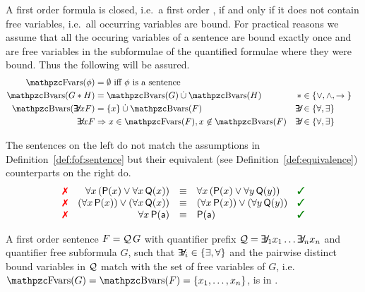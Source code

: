 \begin{definition}\label{def:fof:closed}\label{def:fof:sentence}
	A first order formula is closed, i.e.~a first order ,
	if and only if it does not contain free variables, 
	i.e.~all occurring variables are bound.
	For practical reasons we assume that all the occuring variables of a sentence
	are bound exactly once
	and are free variables
	in the subformulae of the quantified formulae where they were bound.
	Thus the following will be assured.
	\begin{align*}
		\fvar(\phi) &= \emptyset
		\text{ iff }\phi\text{ is a sentence}
		\\
		\bvar(G \connect H) &= \bvar(G)\disjointunion\bvar(H)
		&\connect& \in \SetOfConnectives
		\\
		\bvar(\quantify x F) &= \{x\}\disjointunion\bvar(F)
		&\quantify& \in \SetOfQuantifiers
		\\
		\quantify x F &\Rightarrow
		x\in\fvar(F), x\not\in\bvar(F)
		&\quantify& \in \SetOfQuantifiers
	\end{align*}
\end{definition}

\begin{example}The sentences on the left do not match
	the assumptions in Definition~\vref{def:fof:sentence}
	but their {equivalent (see Definition~\vref{def:equivalence})}
	counterparts on the right do.
	\[
	\begin{array}{rrcll}
		 \text{\color{colLo}{\xmark}}
		& \forall x\, ({\mP(x) \lor \forall x\, {\mQ(x)}})
		& {\equiv}
		& \forall x\, ({\mP(x) \lor \forall y\, {\mQ(y)}})
		& \text{\color{colHi}{\cmark}}
		\\ \text{\color{colLo}{\xmark}}
		& (\forall x\, {\mP(x)}) \lor (\forall x\, {\mQ(x)})
		& {\equiv}
		& (\forall x\, {\mP(x)}) \lor (\forall y\, {\mQ(y)})
		& \text{\color{colHi}{\cmark}}
		\\
		\text{\color{colLo}{\xmark}}
		&  \forall x\, {\mP(\ma)}
		& {\equiv}
		& \mP(\ma)
		& \text{\color{colHi}{\cmark}}
	\end{array}
	\]

\end{example}

\begin{definition}[\PNF]\label{def:prenex:normal:form}
	A first order sentence 
	\( F = \mathcal{Q}\,G \)
	with quantifier prefix 
	\( \mathcal{Q} = \quantify_1 x_1 \ldots \quantify_n x_n \)
	and quantifier free subformula \( G \),
	such that
	\( \quantify_i \in \{ \exists, \forall \} \) 
	and the pairwise distinct bound variables
	in \(\mathcal{Q}\)
	match with the set of free variables of \(G\), 
	i.e.~\( \fvar(G) = \bvar(F) = \{ x_1,\ldots,x_n \} \),
	is in .
\end{definition}

